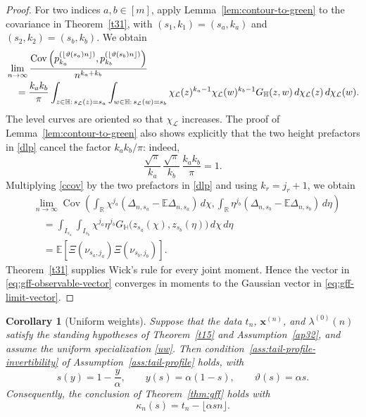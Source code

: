 \documentclass[11pt]{amsart}
\theoremstyle{plain}
\newtheorem{corollary}[theorem]{Corollary}
\numberwithin{equation}{section}
\numberwithin{theorem}{section}
\numberwithin{figure}{section}
\begin{document}
\begin{proof}
For two indices \(a,b\in[m]\), apply
Lemma~\ref{lem:contour-to-green} to the covariance in
Theorem~\ref{t31}, with \((s_1,k_1)=(s_a,k_a)\) and
\((s_2,k_2)=(s_b,k_b)\).  We obtain
\begin{align}
&\lim_{n\to\infty}
\frac{
\operatorname{Cov}\left(
    p_{k_a}^{(\lfloor\vartheta(s_a)n\rfloor)},
    p_{k_b}^{(\lfloor\vartheta(s_b)n\rfloor)}
\right)
}{n^{k_a+k_b}}
\label{ccov}\\
&\quad=
\frac{k_ak_b}{\pi}
\int_{z\in\mathbb H:\,s_{\mathcal L}(z)=s_a}
\int_{w\in\mathbb H:\,s_{\mathcal L}(w)=s_b}
\chi_{\mathcal L}(z)^{k_a-1}
\chi_{\mathcal L}(w)^{k_b-1}
G_{\mathbb H}(z,w)\,
 d\chi_{\mathcal L}(z)\,d\chi_{\mathcal L}(w).
\notag
\end{align}
The level curves are oriented so that \(\chi_{\mathcal L}\) increases.
The proof of Lemma~\ref{lem:contour-to-green} also shows explicitly
that the two height prefactors in \eqref{dlp} cancel the factor
\(k_ak_b/\pi\): indeed,
\[
    \frac{\sqrt\pi}{k_a}\,
    \frac{\sqrt\pi}{k_b}\,
    \frac{k_ak_b}{\pi}=1.
\]
\endgroup
Multiplying \eqref{ccov} by the two prefactors in \eqref{dlp} and using
$k_r=j_r+1$, we obtain
\begin{align*}
&\lim_{n\to\infty}
\operatorname{Cov}\left(
    \int_{\mathbb R}\chi^{j_a}
    (\Delta_{n,s_a}-\mathbb E\Delta_{n,s_a})\,d\chi,
    \int_{\mathbb R}\eta^{j_b}
    (\Delta_{n,s_b}-\mathbb E\Delta_{n,s_b})\,d\eta
\right)\\
&\quad=
\int_{I_{s_a}}\int_{I_{s_b}}
\chi^{j_a}\eta^{j_b}
G_{\mathbb H}\bigl(z_{s_a}(\chi),z_{s_b}(\eta)\bigr)
\,d\chi\,d\eta\\
&\quad=
\mathbb E\left[
    \Xi(\nu_{s_a,j_a})\Xi(\nu_{s_b,j_b})
\right].
\end{align*}
Theorem~\ref{t31} supplies Wick's rule for every joint moment. Hence the
vector in \eqref{eq:gff-observable-vector} converges in moments to the
Gaussian vector in \eqref{eq:gff-limit-vector}.
\end{proof}

\begin{corollary}[Uniform weights]
\label{cor:gff-uniform}
Suppose that the data $t_n$, $\mathbf x^{(n)}$, and
$\lambda^{(0)}(n)$ satisfy the standing hypotheses of
Theorem~\ref{t15} and Assumption~\ref{ap32}, and assume the uniform
specialization \eqref{uw}. Then
condition~\ref{ass:tail-profile-invertibility} of
Assumption~\ref{ass:tail-profile} holds, with
\[
    s(y)=1-\frac{y}{\alpha},
    \qquad
    y(s)=\alpha(1-s),
    \qquad
    \vartheta(s)=\alpha s.
\]
Consequently, the conclusion of Theorem~\ref{thm:gff} holds with
\[
    \kappa_n(s)=t_n-\lfloor\alpha sn\rfloor.
\]
\end{corollary}
\end{document}
